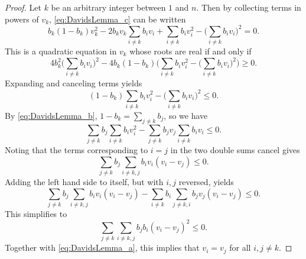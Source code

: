 \begin{proof}
    Let $k$ be an arbitrary integer between $1$ and $n$. 
    Then by collecting terms in powers of $v_k$, \eqref{eq:DavidsLemma_c} 
    can be written
    \begin{equation*}
    		b_k(1-b_k)v_k^2 - 2b_k v_k\sum_{i \neq k}b_i v_i + \sum_{i \neq k}b_i v_i^2 - \biggl(\sum_{i \neq k}b_i v_i\biggr)^{\!\! 2} = 0.  		
	\end{equation*}
	This is a quadratic equation in $v_k$ whose roots are real if and only if
	\begin{equation*}
    		4b_k^2\biggl(\sum_{i \neq k}b_i v_i\biggr)^{\!\! 2} - 4b_k(1-b_k)\Biggl(\sum_{i \neq k}b_i v_i^2 - \biggl(\sum_{i \neq k}b_i v_i\biggr)^{\!\! 2}\Biggr) \geq 0.
	\end{equation*}
	Expanding and canceling terms yields
	\begin{equation*}
    (1-b_k)\sum_{i \neq k}b_i v_i^2 - \biggl(\sum_{i \neq k}b_i v_i\biggr)^{\!\! 2} \leq 0.
	\end{equation*}
	By \eqref{eq:DavidsLemma_b}, $1-b_k = \sum_{j \ne k}b_j$, so we have
	\begin{equation*}
    		\sum_{j \neq k}b_j\sum_{i \neq k}b_i v_i^2 - \sum_{j \neq k}b_j v_j\sum_{i \neq k}b_i v_i \leq 0.
	\end{equation*}
	Noting that the terms corresponding to $i = j$ in the two double sums cancel gives
	\begin{equation*}
    		\sum_{j \neq k}b_j\sum_{i \neq k,j}b_i v_i(v_i - v_j) \leq 0.
	\end{equation*}
	Adding the left hand side to itself, but with $i, j$ reversed, yields
	\begin{equation*}
    		\sum_{j \neq k}b_j\sum_{i \neq k, j}b_i v_i(v_i - v_j) - \sum_{i \neq k}b_i\sum_{j \neq k, i}b_j v_j(v_i - v_j) \leq 0.
	\end{equation*}
	This simplifies to
	\begin{equation*}
    		\sum_{j \neq k}\sum_{i \neq k, j}b_j b_i(v_i - v_j)^2 \leq 0.
	\end{equation*}
	Together with \eqref{eq:DavidsLemma_a}, this implies that $v_i = v_j$ 
	for all $i, j \neq k$.
\end{proof}

